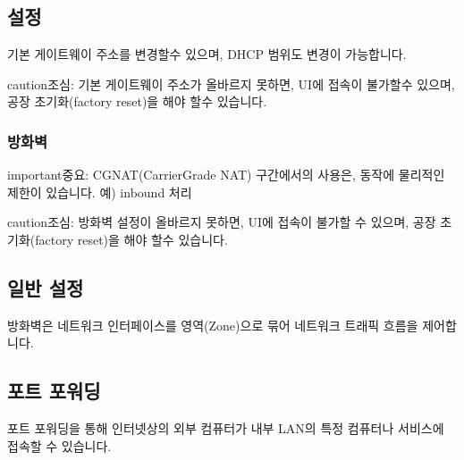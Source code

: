 \documentclass[letterpaper,10pt,english]{sphinxmanual}
\begin{document}
\noindent{}


\subsection{설정}
\label{\detokenize{main_menu/network:id5}}
\sphinxAtStartPar
기본 게이트웨이 주소를 변경할수 있으며, DHCP 범위도 변경이 가능합니다.

\noindent{}

\begin{sphinxadmonition}{caution}{조심:}
\sphinxAtStartPar
기본 게이트웨이 주소가 올바르지 못하면, UI에 접속이 불가할수 있으며, 공장 초기화(factory reset)을 해야 할수 있습니다.
\end{sphinxadmonition}


\subsubsection{방화벽}
\label{\detokenize{main_menu/network:id6}}
\begin{sphinxadmonition}{important}{중요:}
\sphinxAtStartPar
CGNAT(Carrier\sphinxhyphen{}Grade NAT) 구간에서의 사용은, 동작에 물리적인 제한이 있습니다. 예) inbound 처리
\end{sphinxadmonition}

\begin{sphinxadmonition}{caution}{조심:}
\sphinxAtStartPar
방화벽 설정이 올바르지 못하면, UI에 접속이 불가할 수 있으며, 공장 초기화(factory reset)을 해야 할수 있습니다.
\end{sphinxadmonition}


\subsection{일반 설정}
\label{\detokenize{main_menu/network:id7}}
\noindent{}

\sphinxAtStartPar
방화벽은 네트워크 인터페이스를 영역(Zone)으로 묶어 네트워크 트래픽 흐름을 제어합니다.


\subsection{포트 포워딩}
\label{\detokenize{main_menu/network:id8}}
\noindent{}

\sphinxAtStartPar
포트 포워딩을 통해 인터넷상의 외부 컴퓨터가 내부 LAN의 특정 컴퓨터나 서비스에 접속할 수 있습니다.
\end{document}
